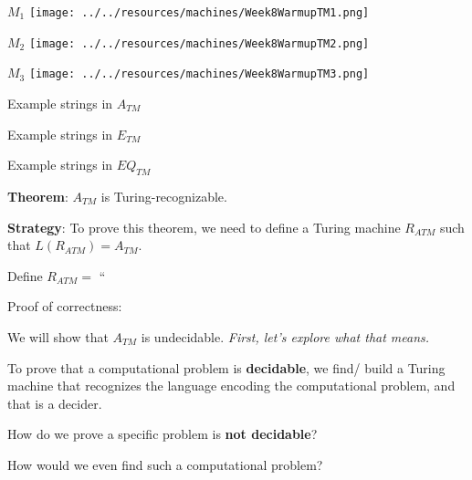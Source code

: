 \documentclass[12pt, oneside]{article}
\begin{document}
    \begin{multicols}{3}
    $M_1$ \texttt{[image: ../../resources/machines/Week8WarmupTM1.png]} 
    
    \columnbreak
    
    $M_2$ \texttt{[image: ../../resources/machines/Week8WarmupTM2.png]}
    
    \columnbreak
    
    $M_3$ \texttt{[image: ../../resources/machines/Week8WarmupTM3.png]}
    \end{multicols}
    
    Example strings in $A_{TM}$
    
    \vfill
    
    Example strings in  $E_{TM}$
    
    \vfill
    
    Example strings in  $EQ_{TM}$
    
    \vfill
    
    \newpage
    
    {\bf  Theorem}: $A_{TM}$  is  Turing-recognizable.
    
    
    {\bf  Strategy}:  To prove this theorem, we need  to  define  a Turing  machine  $R_{ATM}$ such that 
    $L(R_{ATM}) = A_{TM}$.
    
    
    Define $R_{ATM} =  $ ``
    
    \vspace{150pt}
    
    
    Proof of correctness: 
    
    
    \vfill
    \vfill
    
    We will show that $A_{TM}$ is undecidable.   {\it First, let's explore what that means.}
    
    \newpage
    
    To prove that a computational problem is {\bf decidable}, we find/ build a Turing 
    machine that recognizes the language encoding the computational problem, and that 
    is a decider.
    
    
    How do we prove a specific problem is {\bf not decidable}?
    
    How would we even find such a computational problem?
    
\end{document}
